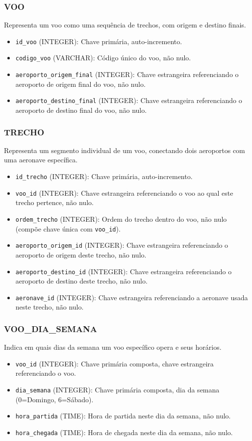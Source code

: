 \subsubsection*{VOO}
Representa um voo como uma sequência de trechos, com origem e destino finais.
\begin{itemize}
    \item \texttt{id\_voo} (INTEGER): Chave primária, auto-incremento.
    \item \texttt{codigo\_voo} (VARCHAR): Código único do voo, não nulo.
    \item \texttt{aeroporto\_origem\_final} (INTEGER): Chave estrangeira referenciando o aeroporto de origem final do voo, não nulo.
    \item \texttt{aeroporto\_destino\_final} (INTEGER): Chave estrangeira referenciando o aeroporto de destino final do voo, não nulo.
\end{itemize}

\subsubsection*{TRECHO}
Representa um segmento individual de um voo, conectando dois aeroportos com uma aeronave específica.
\begin{itemize}
    \item \texttt{id\_trecho} (INTEGER): Chave primária, auto-incremento.
    \item \texttt{voo\_id} (INTEGER): Chave estrangeira referenciando o voo ao qual este trecho pertence, não nulo.
    \item \texttt{ordem\_trecho} (INTEGER): Ordem do trecho dentro do voo, não nulo (compõe chave única com \texttt{voo\_id}).
    \item \texttt{aeroporto\_origem\_id} (INTEGER): Chave estrangeira referenciando o aeroporto de origem deste trecho, não nulo.
    \item \texttt{aeroporto\_destino\_id} (INTEGER): Chave estrangeira referenciando o aeroporto de destino deste trecho, não nulo.
    \item \texttt{aeronave\_id} (INTEGER): Chave estrangeira referenciando a aeronave usada neste trecho, não nulo.
\end{itemize}

\subsubsection*{VOO\_DIA\_SEMANA}
Indica em quais dias da semana um voo específico opera e seus horários.
\begin{itemize}
    \item \texttt{voo\_id} (INTEGER): Chave primária composta, chave estrangeira referenciando o voo.
    \item \texttt{dia\_semana} (INTEGER): Chave primária composta, dia da semana (0=Domingo, 6=Sábado).
    \item \texttt{hora\_partida} (TIME): Hora de partida neste dia da semana, não nulo.
    \item \texttt{hora\_chegada} (TIME): Hora de chegada neste dia da semana, não nulo.
\end{itemize}

